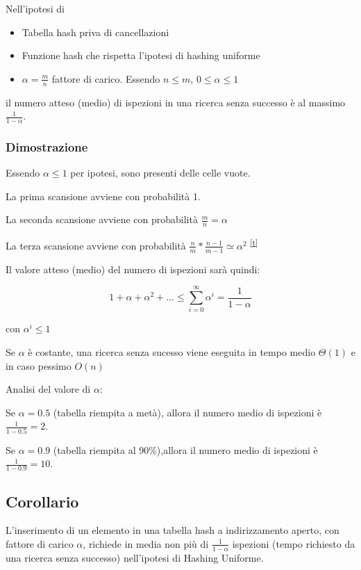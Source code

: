 \documentclass[tikz]{article}
\providecommand{\tightlist}{%
  \setlength{\itemsep}{0pt}\setlength{\parskip}{0pt}}
\begin{document}
{Nell'ipotesi di}

\begin{itemize}
\tightlist
\item
  {Tabella hash priva di cancellazioni}
\item
  {Funzione hash che rispetta l'ipotesi di hashing uniforme}
\item
  {$\alpha = \frac{m}{n}$ fattore di carico. Essendo $n \leq m$, $0 \leq \alpha \leq 1$}
\end{itemize}

{il numero atteso (medio) di ispezioni in una ricerca senza successo è al massimo $\frac{1}{1-\alpha}$.}

\subsubsection{Dimostrazione}

{Essendo $\alpha \leq 1$ per ipotesi, sono presenti delle celle vuote.}

{La prima scansione avviene con probabilità 1.}

{La seconda scansione avviene con probabilità $\frac{m}{n} = \alpha$}

{La terza scansione avviene con probabilità $\frac{n}{m} * \frac{n-1}{m-1} \simeq \alpha^2 $}
\textsuperscript{\protect\hyperlink{cmnt20}{{[}t{]}}}

{Il valore atteso (medio) del numero di ispezioni sarà quindi:}

\begin{equation}
1+\alpha+\alpha^2+\ldots \leq \sum_{i=0}^{\infty}{\alpha^i} = \frac{1}{1-\alpha}
\end{equation}

{con $\alpha^i\leq1$}

{Se $\alpha$ è costante, una ricerca senza sucesso viene eseguita in tempo medio $\Theta(1)$ e in caso pessimo $O(n)$}

{Analisi del valore di $\alpha$:}

{Se $\alpha=0.5$ (tabella riempita a metà), allora il numero medio di ispezioni è $\frac{1}{1-0.5}=2$.}

{Se $\alpha=0.9$ (tabella riempita al 90\%),allora il numero medio di ispezioni è $\frac{1}{1-0.9}=10$.}

\subsection{Corollario}

{L'inserimento di un elemento in una tabella hash a indirizzamento aperto, con fattore di carico $\alpha$, richiede in media non più di $\frac{1}{1-\alpha}$ ispezioni (tempo richiesto da una ricerca senza successo) nell'ipotesi di Hashing Uniforme.}
\end{document}
